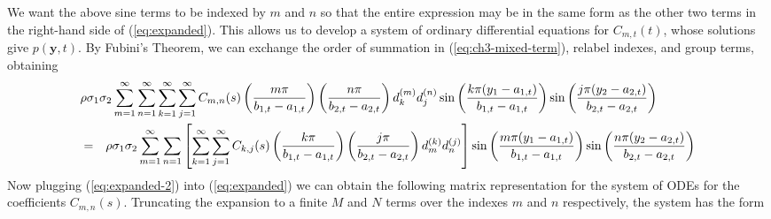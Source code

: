 We want the above sine terms to be indexed by $m$ and $n$ so that the entire expression may be in the same form as the other two terms in the right-hand side of (\ref{eq:expanded}). This allows us to develop a system of ordinary differential equations for $C_{m,t}(t)$, whose solutions give $p(\mathbf{y},t)$. By Fubini's Theorem, we can exchange the order of summation in (\ref{eq:ch3-mixed-term}), relabel indexes, and group terms, obtaining 
\begin{eqnarray}
	\lefteqn{ \rho \sigma_1 \sigma_2 \sum_{m=1}^\infty \sum_{n=1}^\infty \sum_{k = 1}^\infty \sum_{j=1}^\infty C_{m,n}(s) \left( \frac{m\pi}{b_{1,t}-a_{1,t}} \right) \left( \frac{n\pi}{b_{2,t}-a_{2,t}} \right) d_{k}^{(m)} d_{j}^{(n)} \sin\left( \frac{k \pi (y_1 - a_{1,t})}{b_{1,t} - a_{1,t}} \right)\sin\left( \frac{j \pi (y_2 - a_{2,t})}{b_{2,t} - a_{2,t}} \right) } \label{eq:expanded-2} \\
	&=& \rho \sigma_1 \sigma_2 \sum_{m=1}^\infty \sum_{n=1} \left[ \sum_{k = 1}^\infty \sum_{j=1}^\infty C_{k,j}(s) \left( \frac{k\pi}{b_{1,t}-a_{1,t}} \right) \left( \frac{j\pi}{b_{2,t}-a_{2,t}} \right) d_{m}^{(k)} d_{n}^{(j)} \right] \sin\left( \frac{m \pi (y_1 - a_{1,t})}{b_{1,t} - a_{1,t}} \right)\sin\left( \frac{n \pi (y_2 - a_{2,t})}{b_{2,t} - a_{2,t}} \right) \nonumber
\end{eqnarray}
%
Now plugging (\ref{eq:expanded-2}) into (\ref{eq:expanded}) we can obtain the following matrix representation for the system of ODEs for the coefficients $C_{m,n}(s)$. Truncating the expansion to a finite $M$ and $N$ terms over the indexes $m$ and $n$ respectively, the system has the form
